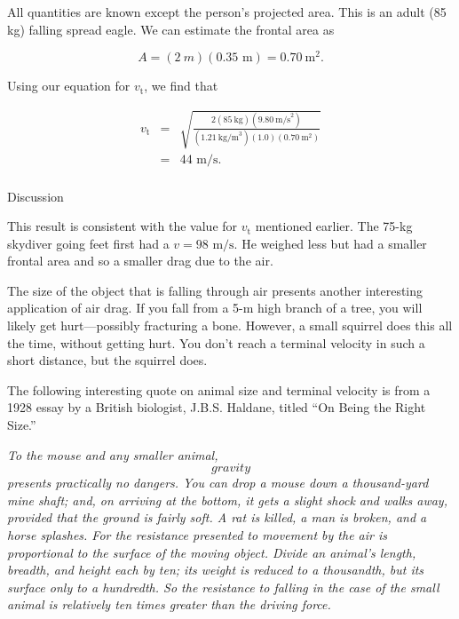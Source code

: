 \documentclass[
]{book}
\newenvironment{tinysection}{}{}
\begin{document}
All quantities are known except the person's projected area. This is an
adult (85 kg) falling spread eagle. We can estimate the frontal area as

\leavevmode\hypertarget{eip-769}{}%
\[{{A = (2\ m)(0\text{.}\text{35\ m}) = 0\text{.}\text{70}\ \text{m}^{2}}.}{}\]

Using our equation for \(v_{\text{t}}{}\), we find that

\leavevmode\hypertarget{eip-656}{}%
\[\begin{array}{lll}
v_{\text{t}} & = & \sqrt{\frac{2(\text{85}\ \text{kg})(9.80\ \text{m/s}^{2})}{(1.21\ \text{kg/m}^{3})(1.0)(0.70\ \text{m}^{2})}} \\
 & = & \text{44\ m/s.} \\
\end{array}\]

\begin{tinysection}

{Discussion}

\end{tinysection}

This result is consistent with the value for \(v_{\text{t}}{}\) mentioned
earlier. The 75-kg skydiver going feet first had a
\({v = \text{98\ m}/\text{s}}{}\). He weighed less but had a smaller
frontal area and so a smaller drag due to the air.

The size of the object that is falling through air presents another
interesting application of air drag. If you fall from a 5-m high branch
of a tree, you will likely get hurt---possibly fracturing a bone.
However, a small squirrel does this all the time, without getting hurt.
You don't reach a terminal velocity in such a short distance, but the
squirrel does.

The following interesting quote on animal size and terminal velocity is
from a 1928 essay by a British biologist, J.B.S. Haldane, titled ``On
Being the Right Size.''

\emph{To the mouse and any smaller animal, \[gravity\] presents practically
no dangers. You can drop a mouse down a thousand-yard mine shaft; and,
on arriving at the bottom, it gets a slight shock and walks away,
provided that the ground is fairly soft. A rat is killed, a man is
broken, and a horse splashes. For the resistance presented to movement
by the air is proportional to the surface of the moving object. Divide
an animal's length, breadth, and height each by ten; its weight is
reduced to a thousandth, but its surface only to a hundredth. So the
resistance to falling in the case of the small animal is relatively ten
times greater than the driving force.}
\end{document}
